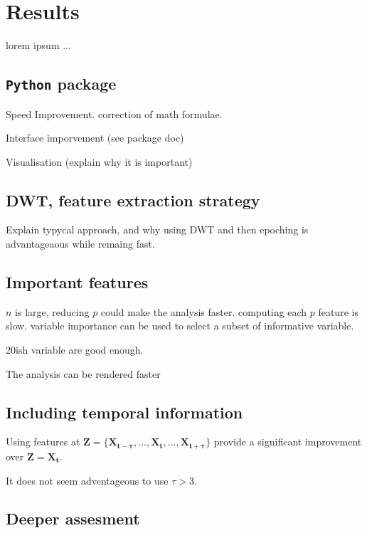 \section{Results} \label{results}

lorem ipsum ...
\subsection{\texttt{Python} package}
Speed Improvement. correction of math formulae.


Interface imporvement (see package doc)

Visualisation (explain why it is important)

\subsection{DWT, feature extraction strategy}
Explain typycal approach, and why using DWT and then epoching is advantageaous while remaing fast.

\subsection{Important features}
$n$ is large, reducing $p$ could make the analysis faster. computing each $p$ feature is slow.
variable importance can be used to select a subset of informative variable.

20ish variable are good enough.

The analysis can be rendered faster
\subsection{Including temporal information}
Using features at $\mathbf{Z} = \{\mathbf{X_{t-\tau}}, ..., \mathbf{X_{t}}, ..., \mathbf{X_{t+\tau}}\}$ provide a significant improvement over $\mathbf{Z} = \mathbf{X_{t}}$.

It does not seem adventageous to use $\tau > 3$.
\subsection{Deeper assesment}

